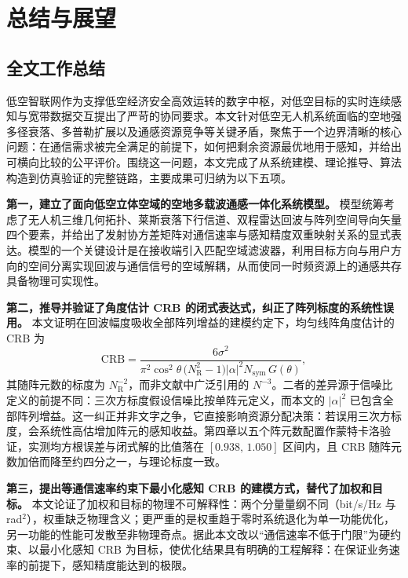 \chapter{总结与展望}
\label{chap:conclusion}

\section{全文工作总结}
\label{sec:summary}

低空智联网作为支撑低空经济安全高效运转的数字中枢，对低空目标的实时连续感知与宽带数据交互提出了严苛的协同要求。本文针对低空无人机系统面临的空地强多径衰落、多普勒扩展以及通感资源竞争等关键矛盾，聚焦于一个边界清晰的核心问题：在通信需求被完全满足的前提下，如何把剩余资源最优地用于感知，并给出可横向比较的公平评价。围绕这一问题，本文完成了从系统建模、理论推导、算法构造到仿真验证的完整链路，主要成果可归纳为以下五项。

\textbf{第一，建立了面向低空立体空域的空地多载波通感一体化系统模型。} 模型统筹考虑了无人机三维几何拓扑、莱斯衰落下行信道、双程雷达回波与阵列空间导向矢量四个要素，并给出了发射协方差矩阵对通信速率与感知精度双重映射关系的显式表达。模型的一个关键设计是在接收端引入匹配空域滤波器，利用目标方向与用户方向的空间分离实现回波与通信信号的空域解耦，从而使同一时频资源上的通感共存具备物理可实现性。

\textbf{第二，推导并验证了角度估计 CRB 的闭式表达式，纠正了阵列标度的系统性误用。} 本文证明在回波幅度吸收全部阵列增益的建模约定下，均匀线阵角度估计的 CRB 为
\begin{equation}
  \mathrm{CRB} = \frac{6\sigma^{2}}{\pi^{2}\cos^{2}\theta\,\bigl(N_{\mathrm{R}}^{2}-1\bigr)\lvert\alpha\rvert^{2}N_{\mathrm{sym}}\,G(\theta)},
  \label{eq:concl_crb}
\end{equation}
其随阵元数的标度为 $N_{\mathrm{R}}^{-2}$，而非文献中广泛引用的 $N^{-3}$。二者的差异源于信噪比定义的前提不同：三次方标度假设信噪比按单阵元定义，而本文的 $\lvert\alpha\rvert^{2}$ 已包含全部阵列增益。这一纠正并非文字之争，它直接影响资源分配决策：若误用三次方标度，会系统性高估增加阵元的感知收益。第四章以五个阵元数配置作蒙特卡洛验证，实测均方根误差与闭式解的比值落在 $[0.938,\,1.050]$ 区间内，且 CRB 随阵元数加倍而降至约四分之一，与理论标度一致。

\textbf{第三，提出等通信速率约束下最小化感知 CRB 的建模方式，替代了加权和目标。} 本文论证了加权和目标的物理不可解释性：两个分量量纲不同（bit/s/Hz 与 rad$^{2}$），权重缺乏物理含义；更严重的是权重趋于零时系统退化为单一功能优化，另一功能的性能可发散至非物理奇点。据此本文改以“通信速率不低于门限”为硬约束、以最小化感知 CRB 为目标，使优化结果具有明确的工程解释：在保证业务速率的前提下，感知精度能达到的极限。


